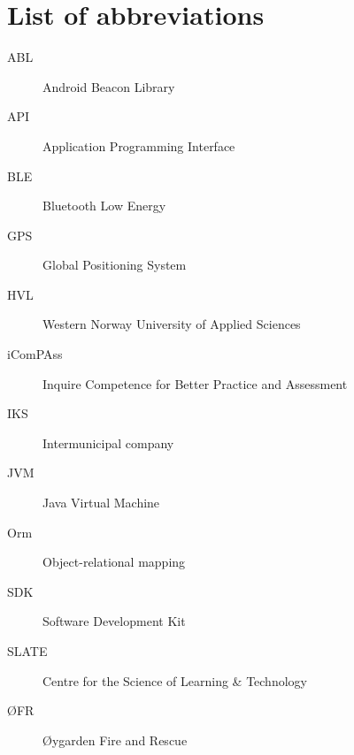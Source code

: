 \documentclass[../Main/thesis.tex]{subfiles}
\begin{document}
\chapter*{List of abbreviations}
\begin{description}
\item[ABL] Android Beacon Library
\item[API] Application Programming Interface
\item[BLE] Bluetooth Low Energy
\item[GPS] Global Positioning System
\item[HVL] Western Norway University of Applied Sciences
\item[iComPAss] Inquire Competence for Better Practice and Assessment
\item[IKS] Intermunicipal company
\item[JVM] Java Virtual Machine
\item[Orm] Object-relational mapping 
\item[SDK] Software Development Kit
\item[SLATE] Centre for the Science of Learning \& Technology
\item[ØFR] Øygarden Fire and Rescue
\end{description}

\blankpage
\end{document}
